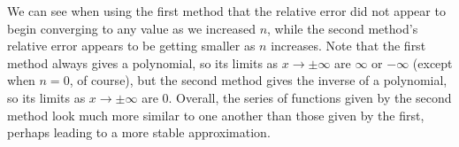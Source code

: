 \documentclass[11pt]{article}
\begin{document}
We can see when using the first method that the relative error did not appear
to begin converging to any value as we increased $n$, while the second method's relative error
appears to be getting smaller as $n$ increases. Note that the first method
always gives a polynomial, so its limits as $x\to\pm\infty$ are $\infty$ or
$-\infty$ (except when $n=0$, of course), but the second method gives the
inverse of a polynomial, so its limits as $x\to\pm\infty$ are 0. Overall,
the series of functions given by the second method look much more similar to
one another than those given by the first, perhaps leading to a more stable
approximation.
\end{document}
